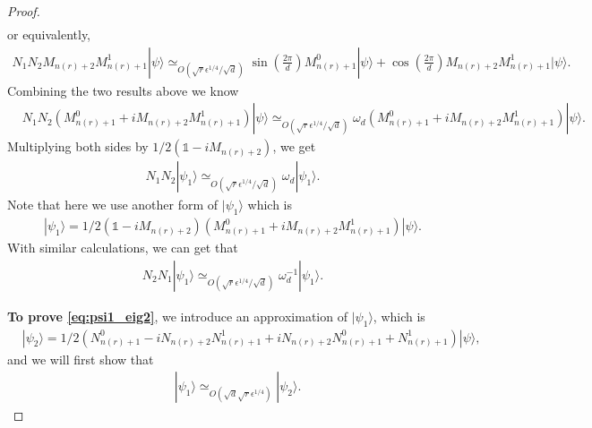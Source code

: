 \documentclass[11pt,letterpaper]{article}
\newcommand{\ket}[1]{|#1\rangle}
\newcommand{\1}{\mathbb{1}}
\newcommand{\nr}{n(r)}
\newcommand{\qe}{\epsilon^{1/4}}
\newcommand{\sd}{\sqrt{d}}
\newcommand{\sr}{\sqrt{r}}
\newcommand{\appd}[1]{\simeq_{#1}}
\theoremstyle{definition}
\begin{document}
\begin{proof}
\begin{align*}
        \end{align*}
        or equivalently,
        \begin{align*}
        		N_1N_2 M_{\nr+2}M_{\nr+1}^1 \ket{\psi}\appd{O(\sr \qe/\sd)} 
		\sin(\frac{2\pi}{d}) M_{\nr+1}^0\ket{\psi} + \cos(\frac{2\pi}{d})M_{\nr+2}M_{\nr+1}^1\ket{\psi}.
        \end{align*}
        Combining the two results above we know
	\begin{align}
		\label{eq:omegad}
		&N_1N_2 (M_{\nr+1}^0 + i M_{\nr+2}M_{\nr+1}^1) \ket{\psi} 
		\appd{O(\sr \qe/\sd)}\omega_d(M_{\nr+1}^0 + iM_{\nr+2}M_{\nr+1}^1) \ket{\psi}.
	\end{align}
	Multiplying both sides by $1/2(\1 - iM_{\nr+2})$, we get
	\begin{align}
		N_1N_2 \ket{\psi_1} \appd{O(\sr \qe/\sd)} \omega_d\ket{\psi_1}.
	\end{align}
	Note that here we use another form of $\ket{\psi_1}$ which is 
	\begin{align*}
	\ket{\psi_1} = 1/2(\1 - iM_{\nr+2})(M_{\nr+1}^0 + i M_{\nr+2}M_{\nr+1}^1) \ket{\psi}.
	\end{align*}
	With similar calculations, we can get that 
	\begin{align}
	    N_2N_1 \ket{\psi_1} \appd{O(\sr \qe/\sd)} \omega_d^{-1}\ket{\psi_1}.
	\end{align}
	
	\textbf{To prove \cref{eq:psi1_eig2}}, we introduce an approximation of $\ket{\psi_1}$, which is 
	\begin{align}
	    &\ket{\psi_2} =1/2 (N_{\nr+1}^0 - iN_{\nr+2}N_{\nr+1}^1+iN_{\nr+2}N_{\nr+1}^0 + N_{\nr+1}^1)\ket{\psi},
	\end{align}
	and we will first show that 
	\begin{align}
	    \label{eq:psi1_eq} &\ket{\psi_1} \appd{O(\sd \sr\qe)} \ket{\psi_2}.
	\end{align}
	

\end{proof}
\end{document}
